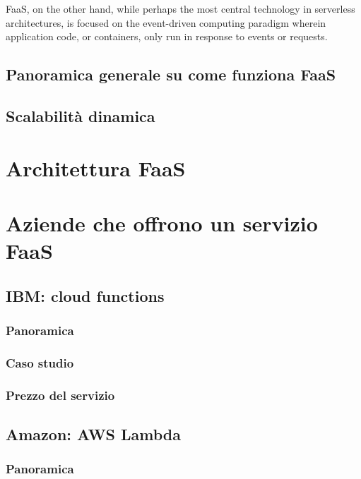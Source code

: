 \documentclass[a4paper]{article}
\begin{document}
	FaaS, on the other hand, while perhaps the most central technology in serverless architectures, is focused on the event-driven computing paradigm wherein application code, or containers, only run in response to events or requests.
	
	\subsection{Panoramica generale su come funziona FaaS}
	
	\subsection{Scalabilità dinamica}
	
	\section{Architettura FaaS}
	
	\section{Aziende che offrono un servizio FaaS}
	
	\subsection{IBM: cloud functions}
	
	\subsubsection{Panoramica}
	
	\subsubsection{Caso studio}
	
	\subsubsection{Prezzo del servizio}
	
	\subsection{Amazon: AWS Lambda}
	
	\subsubsection{Panoramica}
	
\end{document}
